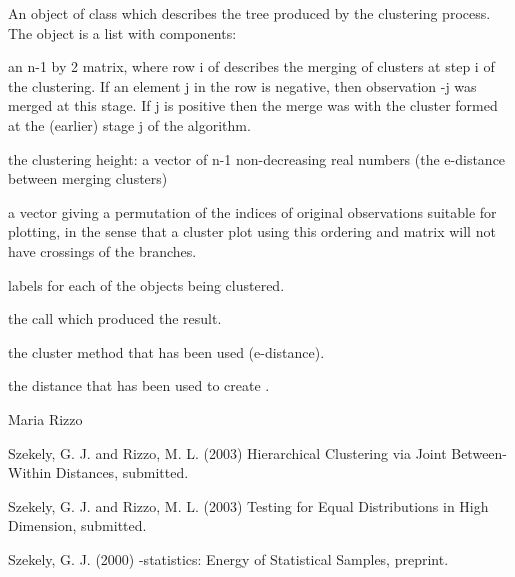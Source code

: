 \begin{Value}
An object of class  which describes the tree produced by
the clustering process. The object is a list with components: 
\begin{ldescription}
\item[\code{merge:}] an n-1 by 2 matrix, where row i of  describes the
merging of clusters at step i of the clustering. If an element j in the
row is negative, then observation -j was merged at this
stage. If j is positive then the merge was with the cluster
formed at the (earlier) stage j of the algorithm.
\item[\code{height:}] the clustering height: a vector of n-1 non-decreasing
real numbers (the e-distance between merging clusters)
\item[\code{order:}] a vector giving a permutation of the indices of 
original observations suitable for plotting, in the sense that a 
cluster plot using this ordering and matrix  will not have 
crossings of the branches.
\item[\code{labels:}] labels for each of the objects being clustered.
\item[\code{call:}] the call which produced the result.
\item[\code{method:}] the cluster method that has been used (e-distance).
\item[\code{dist.method:}] the distance that has been used to create .
\end{ldescription}
\end{Value}
\begin{Author}\relax
Maria Rizzo
\end{Author}
\begin{References}\relax
Szekely, G. J. and Rizzo, M. L. (2003) Hierarchical Clustering
via Joint Between-Within Distances, submitted.

Szekely, G. J. and Rizzo, M. L. (2003) Testing for Equal
Distributions in High Dimension, submitted.

Szekely, G. J. (2000) -statistics: Energy of
Statistical Samples, preprint.\end{References}
\begin{SeeAlso}\relax
{}  
\end{SeeAlso}

